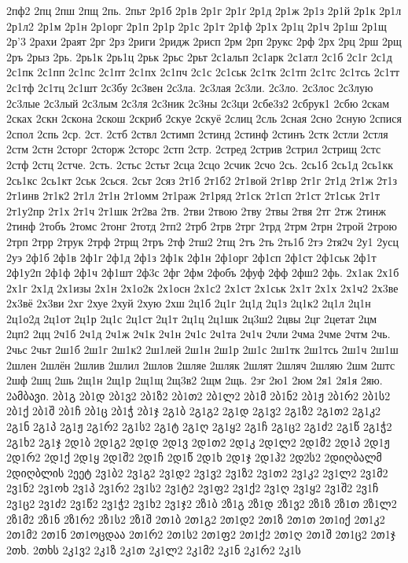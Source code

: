 2пф2
2пц
2пш
2пщ
2пь.
2пьт
2р1б
2р1в
2р1г
2р1ґ
2р1д
2р1ж
2р1з
2р1й
2р1к
2р1л
2р1л2
2р1м
2р1н
2р1орг
2р1п
2р1р
2р1с
2р1т
2р1ф
2р1х
2р1ц
2р1ч
2р1ш
2р1щ
2р'3
2рахи
2раят
2рг
2рз
2риги
2ридж
2рисп
2рм
2рп
2рукс
2рф
2рх
2рц
2рш
2рщ
2ръ
2рыз
2рь.
2рь1к
2рь1ц
2рьк
2рьс
2рьт
2с1альп
2с1арк
2с1атл
2с1б
2с1г
2с1д
2с1пк
2с1пп
2с1пс
2с1пт
2с1пх
2с1пч
2с1с
2с1ськ
2с1тк
2с1тп
2с1тс
2с1тсь
2с1тт
2с1тф
2с1тц
2с1шт
2с3бу
2с3вен
2с3ла.
2с3лая
2с3ли.
2с3ло.
2с3лос
2с3лую
2с3лые
2с3лый
2с3лым
2с3ля
2с3ник
2с3ны
2с3ци
2сбе3з2
2сбрук1
2сбю
2скам
2сках
2скн
2скона
2скош
2скриб
2скуе
2скуё
2слиц
2сль
2сная
2сно
2сную
2спися
2спол
2спь
2ср.
2ст.
2стб
2ствл
2стимп
2стинд
2стинф
2стинъ
2стк
2стли
2стля
2стм
2стн
2сторг
2сторж
2сторс
2стп
2стр.
2стред
2стрив
2стрил
2стрищ
2стс
2стф
2стц
2стче.
2сть.
2стьс
2стьт
2сца
2сцо
2счик
2счо
2сь.
2сь1б
2сь1д
2сь1кк
2сь1кс
2сь1кт
2ськ
2сься.
2сьт
2сяз
2т1б
2т1б2
2т1вой
2т1вр
2т1г
2т1д
2т1ж
2т1з
2т1инв
2т1к2
2т1л
2т1н
2т1омм
2т1раж
2т1ряд
2т1ск
2т1сп
2т1ст
2т1ськ
2т1т
2т1у2пр
2т1х
2т1ч
2т1шк
2т2ва
2тв.
2тви
2твою
2тву
2твы
2твя
2тг
2тж
2тинж
2тинф
2тобъ
2томс
2тонг
2тотд
2тп2
2трб
2трв
2трг
2трд
2трм
2трн
2трой
2трою
2трп
2трр
2трук
2трф
2трщ
2тръ
2тф
2тш2
2тщ
2тъ
2ть
2ть1б
2тэ
2тя2ч
2у1
2усц
2уэ
2ф1б
2ф1в
2ф1г
2ф1д
2ф1з
2ф1к
2ф1н
2ф1орг
2ф1сп
2ф1ст
2ф1ськ
2ф1т
2ф1у2п
2ф1ф
2ф1ч
2ф1шт
2ф3с
2фг
2фм
2фобъ
2фуф
2фф
2фш2
2фь.
2х1ак
2х1б
2х1г
2х1д
2х1изы
2х1н
2х1о2к
2х1осн
2х1с2
2х1ст
2х1ськ
2х1т
2х1х
2х1ч2
2х3ве
2х3вё
2х3ви
2хг
2хуе
2хуй
2хую
2хш
2ц1б
2ц1г
2ц1д
2ц1з
2ц1к2
2ц1л
2ц1н
2ц1о2д
2ц1от
2ц1р
2ц1с
2ц1ст
2ц1т
2ц1ц
2ц1шк
2ц3ш2
2цвы
2цг
2цетат
2цм
2цп2
2цц
2ч1б
2ч1д
2ч1ж
2ч1к
2ч1н
2ч1с
2ч1та
2ч1ч
2чли
2чма
2чме
2чтм
2чь.
2чьс
2чьт
2ш1б
2ш1г
2ш1к2
2ш1лей
2ш1н
2ш1р
2ш1с
2ш1тк
2ш1тсь
2ш1ч
2ш1ш
2шлен
2шлён
2шлив
2шлил
2шлов
2шляе
2шляк
2шлят
2шляч
2шляю
2шм
2штс
2шф
2шц
2шь
2щ1н
2щ1р
2щ1щ
2щ3в2
2щм
2щь.
2эг
2ю1
2юм
2я1
2я1я
2яю.
2ამბავი.
2ბ1გ
2ბ1დ
2ბ1ვ2
2ბ1ზ2
2ბ1თ2
2ბ1ლ2
2ბ1მ
2ბ1ნ2
2ბ1ჟ
2ბ1რ2
2ბ1ს2
2ბ1ქ
2ბ1შ
2ბ1ჩ
2ბ1ც
2ბ1ჭ
2ბ1ჯ
2გ1ბ
2გ1გ2
2გ1დ
2გ1ვ2
2გ1ზ2
2გ1თ2
2გ1კ2
2გ1ნ
2გ1პ
2გ1ჟ
2გ1რ2
2გ1ს2
2გ1ტ
2გ1ღ
2გ1ყ2
2გ1ჩ
2გ1ც2
2გ1ძ2
2გ1წ
2გ1ჭ2
2გ1ხ2
2გ1ჯ
2დ1ბ
2დ1გ2
2დ1დ
2დ1ვ
2დ1თ2
2დ1კ
2დ1ლ2
2დ1მ2
2დ1პ
2დ1ჟ
2დ1რ2
2დ1ქ
2დ1ყ
2დ1შ2
2დ1ჩ
2დ1წ
2დ1ხ
2დ1ჯ
2დ1ჰ2
2დ2ს2
2დიღბალმ
2დიღბლის
2ეეტ
2ვ1ბ2
2ვ1გ2
2ვ1დ2
2ვ1ვ2
2ვ1ზ2
2ვ1თ2
2ვ1კ2
2ვ1ლ2
2ვ1მ2
2ვ1ნ2
2ვ1ოხ
2ვ1პ
2ვ1რ2
2ვ1ს2
2ვ1ტ2
2ვ1ფ2
2ვ1ქ2
2ვ1ღ
2ვ1ყ2
2ვ1შ2
2ვ1ჩ
2ვ1ც2
2ვ1ძ2
2ვ1წ2
2ვ1ჭ2
2ვ1ხ2
2ვ1ჯ2
2ზ1ბ
2ზ1გ
2ზ1დ
2ზ1ვ2
2ზ1ზ
2ზ1თ
2ზ1ლ2
2ზ1მ2
2ზ1ნ
2ზ1რ2
2ზ1ს2
2ზ1შ
2თ1ბ
2თ1გ2
2თ1დ2
2თ1ზ
2თ1თ
2თ1იქ
2თ1კ2
2თ1მ2
2თ1ნ
2თ1ოცდაა
2თ1რ2
2თ1ს2
2თ1ფ2
2თ1ქ2
2თ1ღ
2თ1შ
2თ1ც2
2თ1ჯ
2თხ.
2თხს
2კ1ვ2
2კ1ზ
2კ1თ
2კ1ლ2
2კ1მ2
2კ1ნ
2კ1რ2
2კ1ს

